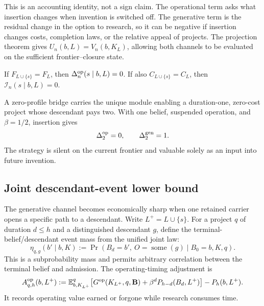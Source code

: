 This is an accounting identity, not a sign claim.  The operational term asks
what insertion changes when invention is switched off.  The generative term
is the residual change in the option to research, so it can be negative if
insertion changes costs, completion laws, or the relative appeal of projects.
The projection theorem gives \(U_n(b,L)=V_n(b,K_L)\), allowing both channels
to be evaluated on the sufficient frontier--closure state.

\begin{corollary}
\label{cor:frontier-silent-insertion}
If \(F_{L\cup\{s\}}=F_L\), then
\(\Delta^{\mathrm{op}}_n(s\mid b,L)=0\).  If also
\(C_{L\cup\{s\}}=C_L\), then \(\mathcal I_n(s\mid b,L)=0\).
\end{corollary}

\begin{example}
\label{ex:operational-zero-generative-positive}
A zero-profile bridge carries the unique module enabling a duration-one,
zero-cost project whose descendant pays two.  With one belief, suspended
operation, and \(\beta=1/2\), insertion gives
\begin{equation}\label{eq:operational-zero-generative-positive}
 \Delta^{\mathrm{op}}_2=0,
 \qquad \Delta^{\mathrm{gen}}_2=1.
\end{equation}
The strategy is silent on the current frontier and valuable solely as an
input into future invention.
\end{example}

\subsection{Joint descendant-event lower bound}

The generative channel becomes economically sharp when one retained carrier
opens a specific path to a descendant.  Write \(L^+=L\cup\{s\}\).  For a
project \(q\) of duration \(d\le h\) and a distinguished descendant \(g\),
define the terminal-belief/descendant event mass from the unified joint law:
\begin{equation}\label{eq:t6-joint-descendant-mass}
 \eta_{q,g}(b'\mid b,K)
 :=\Pr\!\left(B_d=b',\ O=\operatorname{some}(g)
       \mid B_0=b,K,q\right).
\end{equation}
This is a subprobability mass and permits arbitrary correlation between the
terminal belief and admission.  The operating-timing adjustment is
\begin{equation}\label{eq:t6-operating-adjustment}
 A^{\mathrm{op}}_{q,h}(b,L^+)
 :=\mathbb E^q_{b,K_{L^+}}\!\left[
   G^{\mathrm{op}}(K_{L^+},q,\mathbf B)
   +\beta^dP_{h-d}(B_d,L^+)\right]-P_h(b,L^+).
\end{equation}
It records operating value earned or forgone while research consumes time.

